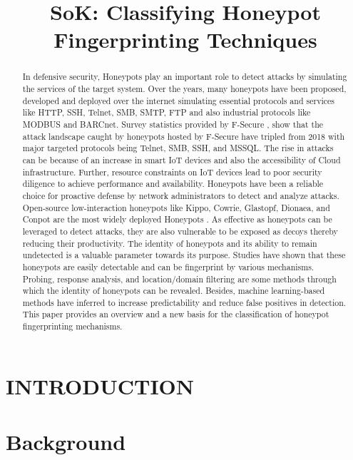 \documentclass[letterpaper, 10 pt, conference]{ieeeconf}  %
\title{\LARGE \bf
SoK: Classifying Honeypot Fingerprinting Techniques
}
\begin{document}
\maketitle
\thispagestyle{empty}
\pagestyle{empty}
\begin{abstract}
In defensive security, Honeypots play an important role to detect attacks by simulating the services of the target system. Over the years, many honeypots have been proposed, developed and deployed over the internet simulating essential protocols and services like HTTP, SSH, Telnet, SMB, SMTP, FTP and also industrial protocols like MODBUS and BARCnet. Survey statistics provided by F-Secure \cite{F-Secure}, show that the attack landscape caught by honeypots hosted by F-Secure have tripled from 2018 with major targeted protocols being Telnet, SMB, SSH, and  MSSQL. The rise in attacks can be because of an increase in smart IoT devices and also the accessibility of Cloud infrastructure. Further, resource constraints on IoT devices lead to poor security diligence to achieve performance and availability. Honeypots have been a reliable choice for proactive defense by network administrators to detect and analyze attacks. Open-source low-interaction honeypots like Kippo, Cowrie, Glastopf, Dionaea, and Conpot are the most widely deployed Honeypots \cite{Vetterl2018}. As effective as honeypots can be leveraged to detect attacks, they are also vulnerable to be exposed as decoys thereby reducing their productivity. The identity of honeypots and its ability to remain undetected is a valuable parameter towards its purpose. Studies have shown that these honeypots are easily detectable and can be fingerprint by various mechanisms. Probing, response analysis, and location/domain filtering are some methods through which the identity of honeypots can be revealed. Besides, machine learning-based methods have inferred to increase predictability and reduce false positives in detection. This paper provides an overview and a new basis for the classification of honeypot fingerprinting mechanisms. 
\end{abstract}

\section{INTRODUCTION}


\section{Background}

\end{document}
